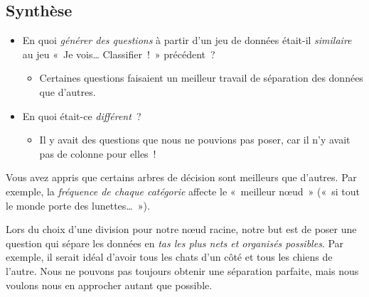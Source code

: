 \documentclass[12pt,a4paper]{article}
\begin{document}
\subsection{Synthèse}

\begin{thinkbox}
  \begin{itemize}
    \item En quoi \emph{générer des questions} à partir d'un jeu de données était-il \emph{similaire} au jeu «~Je vois… Classifier~!~» précédent~?
    \begin{itemize}
      \item Certaines questions faisaient un meilleur travail de séparation des données que d'autres.
    \end{itemize}
    \item En quoi était-ce \emph{différent}~?
    \begin{itemize}
      \item Il y avait des questions que nous ne pouvions pas poser, car il n'y avait pas de colonne pour elles~!
    \end{itemize}
  \end{itemize}
\end{thinkbox}

\begin{keypointbox}
  Vous avez appris que certains arbres de décision sont meilleurs que d'autres. Par exemple, la \emph{fréquence de chaque catégorie} affecte le «~meilleur nœud~» («~si tout le monde porte des lunettes…~»).

  Lors du choix d'une division pour notre nœud racine, notre but est de poser une question qui sépare les données en \emph{tas les plus nets et organisés possibles}. Par exemple, il serait idéal d'avoir tous les chats d'un côté et tous les chiens de l'autre. Nous ne pouvons pas toujours obtenir une séparation parfaite, mais nous voulons nous en approcher autant que possible.
\end{keypointbox}
\end{document}
